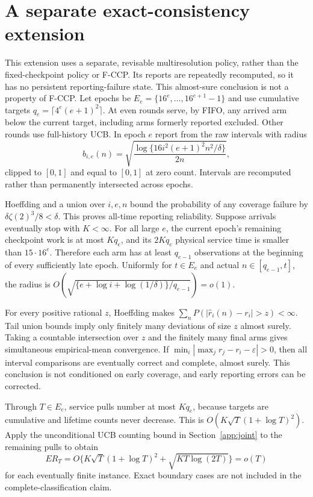 \documentclass[11pt]{article}
\theoremstyle{remark}
\begin{document}
\section{A separate exact-consistency extension}
\label{app:consistency}

This extension uses a separate, revisable multiresolution policy, rather
than the fixed-checkpoint policy or F-CCP. Its reports are repeatedly
recomputed, so it has no persistent reporting-failure state. This
almost-sure conclusion is not a property of F-CCP. Let epochs be $E_e=\{16^e,\ldots,16^{e+1}-1\}$ and use cumulative targets
$q_e=\lceil4^e(e+1)^2\rceil$. At even rounds serve, by FIFO, any arrived
arm below the current target, including arms formerly reported excluded.
Other rounds use full-history UCB. In epoch $e$ report from the raw intervals
with radius
\[
 b_{i,e}(n)=\sqrt{\frac{\log\{16i^2(e+1)^2n^2/\delta\}}{2n}},
\]
clipped to $[0,1]$ and equal to $[0,1]$ at zero count. Intervals are
recomputed rather than permanently intersected across epochs.

Hoeffding and a union over $i,e,n$ bound the probability of any coverage
failure by $\delta\zeta(2)^3/8<\delta$. This proves all-time reporting
reliability. Suppose arrivals eventually stop with $K<\infty$. For all large
$e$, the current epoch's remaining checkpoint work is at most $Kq_e$, and
its $2Kq_e$ physical service time is smaller than $15\cdot16^e$. Therefore
each arm has at least $q_{e-1}$ observations at the beginning of every
sufficiently late epoch. Uniformly for $t\in E_e$ and actual
$n\in[q_{e-1},t]$, the radius is
$O(\sqrt{\{e+\log i+\log(1/\delta)\}/q_{e-1}})=o(1)$.

For every positive rational $z$, Hoeffding makes
$\sum_nP(|\hat r_i(n)-r_i|>z)<\infty$. Tail union bounds imply only
finitely many deviations of size $z$ almost surely. Taking a countable
intersection over $z$ and the finitely many final arms gives simultaneous
empirical-mean convergence. If
$\min_i|\max_jr_j-r_i-\varepsilon|>0$, then all interval comparisons
are eventually correct and complete, almost surely. This conclusion is not
conditioned on early coverage, and early reporting errors can be corrected.

Through $T\in E_e$, service pulls number at most $Kq_e$, because targets are
cumulative and lifetime counts never decrease. This is
$O(K\sqrt T(1+\log T)^2)$. Apply the unconditional UCB counting bound in Section~\ref{app:joint} to
the remaining pulls to obtain
\[
 ER_T=O\{K\sqrt T(1+\log T)^2+\sqrt{KT\log(2T)}\}=o(T)
\]
for each eventually finite instance. Exact boundary cases are not included
in the complete-classification claim.
\end{document}
